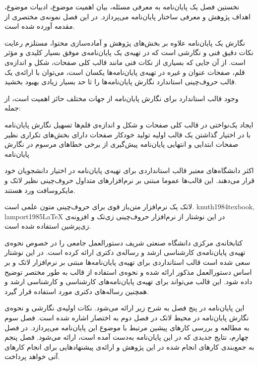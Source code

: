 


نخستین فصل یک پایان‌نامه به معرفی مسئله، بیان اهمیت موضوع، ادبیات موضوع،
اهداف پژوهش و معرفی ساختار پایان‌نامه می‌پردازد.
در این فصل نمونه‌ی مختصری از مقدمه آورده شده است.


نگارش یک پایان‌نامه‌ علاوه بر بخش‌های پژوهش و آماده‌سازی محتوا،
مستلزم رعایت نکات دقیق فنی و نگارشی است 
که در تهیه‌ی یک پایان‌نامه‌ی موفق بسیار کلیدی و مؤثر است.
از آن جایی که بسیاری از نکات فنی مانند قالب کلی صفحات، شکل و اندازه‌ی قلم، 
صفحات عنوان و غیره در تهیه‌ی پایان‌نامه‌ها یکسان است،
می‌توان با ارائه‌ی یک قالب حروف‌چینی استاندارد 
نگارش پایان‌نامه‌ها را تا حد بسیار زیادی بهبود بخشید.


وجود قالب استاندارد برای نگارش پایان‌نامه از جهات مختلف حائز اهمیت است، از جمله:

ایجاد یک‌نواختی در قالب کلی صفحات و شکل و اندازه‌ی قلم‌ها
تسهیل نگارش پایان‌نامه با در اختیار گذاشتن یک قالب اولیه 
تولید خودکار صفحات دارای بخش‌های تکراری نظیر صفحات ابتدایی و انتهایی پایان‌نامه
پیش‌گیری از برخی خطاهای مرسوم در نگارش پایان‌نامه


اکثر دانشگاه‌های معتبر قالب استانداردی برای تهیه‌ی پایان‌نامه در اختیار دانشجویان خود قرار می‌دهند.
این قالب‌ها عموما مبتنی بر نرم‌افزارهای متداول حروف‌چینی نظیر لاتک و مایکروسافت ورد هستند.

 لاتک یک نرم‌افزار متن‌باز قوی برای حروف‌چینی متون علمی است.
 {knuth1984texbook, lamport1985LaTeX} 
در این نوشتار از نرم‌افزار حروف‌چینی زی‌تک 
 و افزونه‌ی زی‌پرشین
 استفاده شده است.



کتابخانه‌ی مرکزی دانشگاه صنعتی شریف دستورالعمل جامعی را در خصوص
نحوه‌ی تهیه‌ی پایان‌نامه‌ی کارشناسی ارشد و رساله‌ی دکتری ارائه کرده است.
در این نوشتار سعی شده است قالب استانداردی برای تهیه‌ی پایان‌نامه‌ها مبتنی بر نرم‌افزار لاتک و
بر اساس دستورالعمل مذکور ارائه شده و
نحوه‌ی استفاده از قالب به طور مختصر توضیح داده شود.
این قالب  می‌تواند برای تهیه‌ی پایان‌نامه‌های کارشناسی و کارشناسی ارشد 
و همچنین رساله‌ها‌ی دکتری مورد استفاده قرار گیرد.


این پایان‌نامه در پنج فصل به شرح زیر ارائه می‌شود.
نکات اولیه‌ی نگارشی و نحوه‌ی نگارش پایان‌نامه در محیط لاتک در  فصل دوم به اختصار اشاره شده است. 
فصل سوم به مطالعه و بررسی کارهای پیشین مرتبط با موضوع این پایان‌نامه می‌پردازد.
در فصل چهارم، نتایج جدیدی که در این پایان‌نامه به‌دست آمده است، ارائه می‌شود.
فصل پنجم به جمع‌بندی کارهای انجام شده در این پژوهش و ارائه‌ی پیشنهادهایی برای انجام کارهای آتی خواهد پرداخت.
